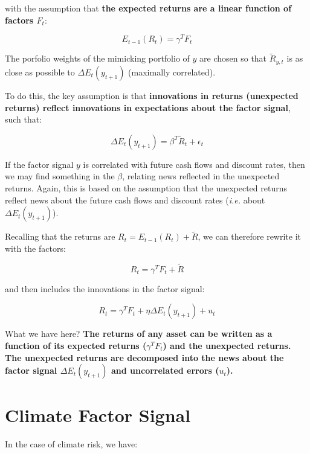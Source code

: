 with the assumption that \textbf{the expected returns are a linear 
function of factors $F_{t}$}:

\begin{equation}
    E_{t-1}(R_t) = \gamma^T F_{t}
\end{equation}


The porfolio weights of the mimicking portfolio of $y$ 
are chosen so that $\tilde{R}_{y,t}$ is as close as possible
to $\Delta E_t(y_{t+1})$ (maximally correlated).

To do this, the key assumption is that 
\textbf{innovations in returns (unexpected returns)
reflect innovations in expectations about 
the factor signal}, such that:

\begin{equation}
    \Delta E_t(y_{t+1}) = \beta^T \tilde{R}_t + \epsilon_t
\end{equation}

If the factor signal $y$ is correlated 
with future cash flows and discount rates,
then we may find something in the $\beta$, relating
news reflected in the unexpected returns. 
Again, this is based on the assumption that 
the unexpected returns reflect news about the
future cash flows and discount rates (\textit{i.e.}
about $\Delta E_t(y_{t+1})$).

Recalling that the returns are $R_t = E_{t-1}(R_t) + \tilde{R}$,
we can therefore rewrite it with the factors:

\begin{equation}
    R_t = \gamma^T F_{t} + \tilde{R}
\end{equation}

and then includes the innovations in the factor signal:

\begin{equation}
    R_t = \gamma^T F_{t} + \eta \Delta E_t(y_{t+1}) + u_{t}
\end{equation}

What we have here? 
\textbf{The returns of any asset can be written 
as a function of its expected returns ($\gamma^T F_{t}$)
and the unexpected returns. The unexpected returns are 
decomposed into the news about the factor signal $\Delta E_t (y_{t+1})$ and
uncorrelated errors ($u_t$).}

\section{Climate Factor Signal}

In the case of climate risk, we have:

